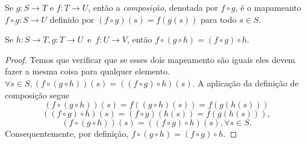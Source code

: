\begin{definition}
  Se $g:S \to T$ e $f:T \to U$, então a \emph{composição}, denotada por $f \circ g$, é o mapameanto $f \circ g: S \to U$ definido por $(f \circ g)(s) = f(g(s))$ para todo $s \in S$.
\end{definition}
\begin{lemma}\label{comp-assoc}
  Se $h:S \to T, g:T \to U$\ e\ $f:U \to V$, então $f\circ (g\circ h) = (f \circ g)\circ h.$
  \begin{proof}
    Temos que verificar que se esses dois mapeamento são iguais eles devem fazer a mesma coisa para qualquer elemento.\\
    $\forall s \in S, (f\circ(g\circ h))(s) = ((f \circ g)\circ h)(s).$ A aplicação da definição de composição segue $$(f\circ (g\circ h))(s)=f((g\circ h)(s))=f(g(h(s)))$$ $$((f\circ g)\circ h)(s)=(f\circ g)(h(s))=f(g(h(s))),$$ $$(f\circ (g \circ h))(s)=((f \circ g)\circ h)(s), \forall s \in S.$$
    Consequentemente, por definição, $f \circ (g \circ h) = (f\circ g) \circ h.$
  \end{proof}
\end{lemma}

